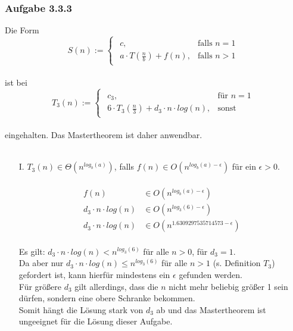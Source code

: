 \documentclass{article}
\begin{document}
\subsubsection{Aufgabe 3.3.3}
    Die Form\\
    \[
	S(n) :=  \begin{cases}
	    	\begin{array}{ll}
    			c, & \text{falls }n=1\\
				a \cdot T(\frac{n}{b})+f(n), &\text{falls }n>1
			\end{array}
		\end{cases}
   	\]
   	\\
   	ist bei\\
   	\[
	T_3(n) := \begin{cases}
				\begin{array}{ll}
					c_3,			& \text{für }n=1\\
					6 \cdot T_3(\frac{n}{3})+d_3\cdot n\cdot log(n), & \text{sonst}
				\end{array}
			\end{cases}
   	\]
   	\\
   	eingehalten. Das Mastertheorem ist daher anwendbar.\\
   	\\
   	\begin{enumerate}
   	    \item[I.]
   	    $T_3(n) \in \Theta (n^{log_b(a)})$, falls $f(n) \in O(n^{log_b(a)- \epsilon})$ für ein $\epsilon > 0$.\\
   	    \\
   	    \[
   	        \begin{array}{ll}
   	            f(n) &\in O(n^{log_b(a)- \epsilon})\\
   	            d_3\cdot n\cdot log(n) &\in O(n^{log_3(6)- \epsilon})\\
   	            d_3\cdot n\cdot log(n) &\in O(n^{1.6309297535714573- \epsilon})
   	        \end{array}
   	    \]
   	    \\
   	    Es gilt: $d_3\cdot n\cdot log(n) < n^{log_3(6)}$ für alle $n > 0$, für $d_3 = 1$.\\
   	    Da aber nur $d_3\cdot n\cdot log(n) \leq n^{log_3(6)}$ für alle $n > 1$ (s. Definition $T_3$) gefordert ist, kann hierfür mindestens ein $\epsilon$ gefunden werden.\\
   	    Für größere $d_3$ gilt allerdings, dass die $n$ nicht mehr beliebig größer 1 sein dürfen, sondern eine obere Schranke bekommen.\\
   	    Somit hängt die Lösung stark von $d_3$ ab und das Mastertheorem ist ungeeignet für die Lösung dieser Aufgabe.
   	\end{enumerate}
\end{document}
